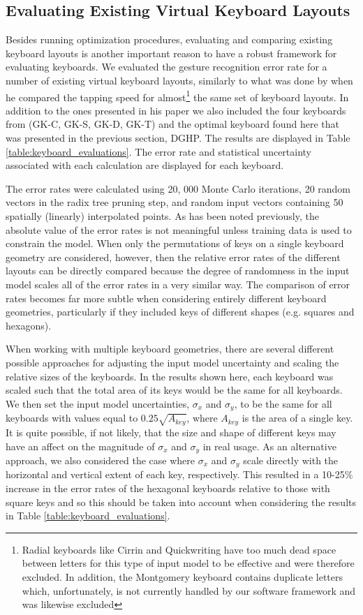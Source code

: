 \documentclass[final,1p,times,authoryear]{elsarticle}
\begin{document}
\subsection{Evaluating Existing Virtual Keyboard Layouts}
Besides running optimization procedures, evaluating and comparing existing keyboard layouts is another 
important reason to have a robust framework for evaluating keyboards. We evaluated the gesture recognition error rate
for a number of existing virtual keyboard layouts, similarly to what was done by \cite{fastSwiping} when he compared the 
tapping speed for almost\footnote{Radial keyboards like Cirrin and Quickwriting have too much dead space between letters
for this type of input model to be effective and were therefore excluded. In addition, the Montgomery keyboard contains duplicate
letters which, unfortunately, is not currently handled by our software framework and was likewise excluded} 
the same set of keyboard layouts. In addition to the ones presented in his paper we also included the four
keyboards from \cite{googleKeyboard} (GK-C, GK-S, GK-D, GK-T) and the optimal keyboard found here that was presented
in the previous section, DGHP.
The results are displayed in Table \ref{table:keyboard_evaluations}.
The error rate and statistical uncertainty associated with each calculation are displayed for each keyboard. 

The error rates were calculated using 20, 000 Monte Carlo iterations, 20 random vectors in the radix tree pruning step, and random input vectors containing 50 spatially (linearly) interpolated points. As has been noted previously, the absolute value of the error rates is not meaningful unless training data is used to constrain the model. When only the permutations of keys on a single keyboard geometry are considered, however, then the relative error rates of the different layouts can be directly compared because the degree of randomness in the input model scales all of the error rates in a very similar way. The comparison of error rates becomes far more subtle when considering entirely different keyboard geometries, particularly if they included keys of different shapes (e.g. squares and hexagons).

When working with multiple keyboard geometries, there are several different possible approaches for adjusting the input model uncertainty and scaling the relative sizes of the keyboards. In the results shown here, each keyboard was scaled such that the total area of its keys would be the same for all keyboards. We then set the input model uncertainties, $\sigma_x$ and $\sigma_y$, to be the same for all keyboards with values equal to $0.25\sqrt{A_{key}}$, where $A_{key}$ is the area of a single key. It is quite possible, if not likely, that the size and shape of different keys may have an affect on the magnitude of $\sigma_x$ and $\sigma_y$ in real usage. As an alternative approach, we also considered the case where $\sigma_x$ and $\sigma_y$ scale directly with the horizontal and vertical extent of each key, respectively. This resulted in a 10-25\% increase in the error rates of the hexagonal keyboards relative to those with square keys and so this should be taken into account when considering the results in Table \ref{table:keyboard_evaluations}.
\end{document}
